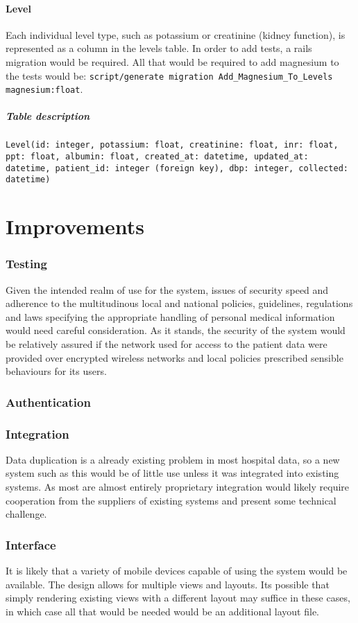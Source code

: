 \documentclass[letterpaper]{amsart}
\begin{document}
\subsection{Level}
Each individual level type, such as potassium or creatinine (kidney function), is represented as a column in the levels table.  In order to add tests, a rails migration would be required.  All that would be required to add magnesium to the tests would be: \texttt{script/generate migration Add\_Magnesium\_To\_Levels magnesium:float}.
\subsubsection{Table description}
\texttt{Level(id: integer, potassium: float, creatinine: float, inr: float, ppt: float, albumin: float, created\_at: datetime, updated\_at: datetime, patient\_id: integer (foreign key), dbp: integer, collected: datetime)}

\part{Improvements}
\section{Testing} 
Given the intended realm of use for the system, issues of security speed and adherence to the multitudinous local and national policies, guidelines, regulations and laws specifying the appropriate handling of personal medical information would need careful consideration.  As it stands, the security of the system would be relatively assured if the network used for access to the patient data were provided over encrypted wireless networks and local policies prescribed sensible behaviours for its users.
\section{Authentication}

\section{Integration}
Data duplication is a already existing problem in most hospital data, so a new system such as this would be of little use unless it was integrated into existing systems.  As most are almost entirely proprietary integration would likely require cooperation from the suppliers of existing systems and present some technical challenge.
\section{Interface}
It is likely that a variety of mobile devices capable of using the system would be available.  The design allows for multiple views and layouts.  Its possible that simply rendering existing views with a different layout may suffice in these cases, in which case all that would be needed would be an additional layout file.
\end{document}
